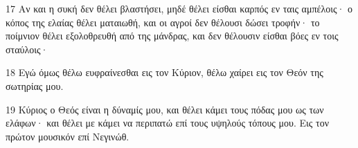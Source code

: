 \par 17 Αν και η συκή δεν θέλει βλαστήσει, μηδέ θέλει είσθαι καρπός εν ταις αμπέλοις· ο κόπος της ελαίας θέλει ματαιωθή, και οι αγροί δεν θέλουσι δώσει τροφήν· το ποίμνιον θέλει εξολοθρευθή από της μάνδρας, και δεν θέλουσιν είσθαι βόες εν τοις σταύλοις·
\par 18 Εγώ όμως θέλω ευφραίνεσθαι εις τον Κύριον, θέλω χαίρει εις τον Θεόν της σωτηρίας μου.
\par 19 Κύριος ο Θεός είναι η δύναμίς μου, και θέλει κάμει τους πόδας μου ως των ελάφων· και θέλει με κάμει να περιπατώ επί τους υψηλούς τόπους μου. Εις τον πρώτον μουσικόν επί Νεγινώθ.


